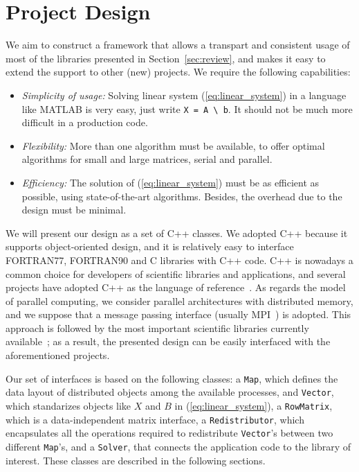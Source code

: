 \documentclass[acmtocl]{acmtrans2m}
\begin{document}
\section{Project Design}
\label{sec:design}

We aim to construct a framework that allows a transpart and consistent usage
of most of the libraries presented in Section~\ref{sec:review}, and makes it easy
to extend the support to other (new) projects. We require the following capabilities:
\begin{itemize}

\item {\sl Simplicity of usage:} Solving linear system (\ref{eq:linear_system}) in a language
like MATLAB is very easy, just write \verb!X = A \ b!. It should not be much
more difficult in a production code.

\item {\sl Flexibility:} More than one algorithm must be available,
  to offer optimal algorithms for small and large matrices, serial and
  parallel.

\item {\sl Efficiency:} The solution of (\ref{eq:linear_system}) must be as
efficient as possible, using state-of-the-art algorithms. Besides, the
overhead due to the design must be minimal.
\end{itemize}

We will present our design as a set of C++ classes. We adopted C++ because it
supports object-oriented design, and it is relatively easy to interface
FORTRAN77, FORTRAN90 and C libraries with C++ code. C++ is nowadays a common
choice for developers  of scientific libraries and applications, and several
projects have adopted C++ as the language of
reference~\cite{heroux05trilinos}. As regards the model of parallel computing,
we consider parallel architectures with distributed memory, and we suppose
that a message passing interface (usually MPI~\cite{mpi-forum}) is adopted.
This approach is followed by the most important scientific libraries currently
available~\cite{heroux05trilinos,petsc-user-ref,falgout02hypre}; as a result, the presented
design can be easily interfaced with the aforementioned projects.

\bigskip

Our set of interfaces is based on the following classes: a {\tt Map}, which
defines the data layout of distributed objects among the available processes,
and {\tt Vector}, which standarizes objects like $X$ and $B$ in
(\ref{eq:linear_system}), a {\tt RowMatrix}, which is a data-independent
matrix interface, a {\tt Redistributor}, which encapsulates all the operations
required to redistribute {\tt Vector}'s between two different {\tt Map}'s, and
a {\tt Solver}, that connects the application code to the library of interest.
These classes are described in the following sections.
\end{document}
